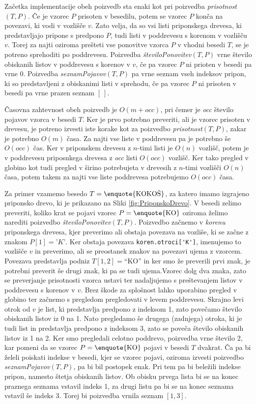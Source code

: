 Začetka implementacije obeh poizvedb sta enaki kot pri poizvedba \textit{prisotnost}$(T,P)$. Če je vzorec $P$ prisoten v besedilu, potem se vzorec $P$ konča na povezavi, ki vodi v vozlišče $v$. Zato velja, da so vsi listi priponskega drevesa, ki predstavljajo pripone s predpono $P$, tudi listi v poddrevesu s korenom v vozlišču $v$. Torej za najti oziroma prešteti vse ponovitve vzorca $P$ v vhodni besedi $T$, se je potreno sprehoditi po poddrevesu. Poizvedba \textit{številoPonovitev}$(T,P)$ vrne število obiskanih listov v poddrevesu s korenov v $v$, če pa vzorec $P$ ni prioten v besedi pa vrne $0$. Poizvedba \textit{seznamPojavov}$(T,P)$ pa vrne seznam vseh indeksov pripon, ki so predstavljeni z obiskanimi listi v sprehodu, če pa vzorec $P$ ni prisoten v besedi pa vrne prazen seznam $[~]$.

Časovna zahtevnost obeh poizvedb je $O(m+\textit{occ})$, pri čemer je \textit{occ} število pojavov vzorca v besedi $T$. Ker je prvo potrebno preveriti, ali je vzorec prisoten v drevesu, je potreno izvesti iste korake kot za poizvedbo \textit{prisotnost}$(T,P)$, zakar je potrebno $O(m)$ časa. Za najti vse liste v poddrevesu pa je potrebno še $O(\textit{occ})$ čas. Ker v priponskem drevesu z $n$-timi listi je $O(n)$ vozlišč, potem je v poddrevesu priposnkega drevesa z \textit{occ} listi $O(\textit{occ})$ vozlišč. Ker tako pregled v globino kot tudi pregled v širino potrebujeta v drevesih z $n$-timi vozlišči $O(n)$ časa, potem takem za najti vse liste poddrevesa potrebujemo $O(\textit{occ})$ časa.

Za primer vzamemo besedo $T=\text{\enquote{KOKOŠ}}$, za katero imamo izgrajeno priponsko drevo, ki je prikazano na Sliki \ref{fig:PriponskoDrevo}. V besedi zelimo preveriti, koliko krat se pojavi vzorec $P=\text{\enquote{KO}}$ oziroma želimo narediti poizvedbo \textit{številoPonovitev}$(T,P)$. Poizvedbo začnemo v \textit{korenu} priponskega drevesa, kjer preverimo ali obstaja povezava na vozliše, ki se začne z znakom $P[1]=\textit{'K'}$. Ker obstaja povezava \verb|koren.otroci['K']|, imenujemo to vozlišče $v$ in preverimo, ali se preostanek znakov na povezavi ujema z vzorcem. Povezava predstavlja podniz $T[1,2]=$\enquote{KO} in ker smo že preverili prvi znak, je potrebni preverit še drugi znak, ki pa se tudi ujema.Vzorec dolg dva znaka, zato se preverjanje prisotnosti vzorca ustavi ter nadaljujemo s preštevanjem listov v poddrevesu s korenov v $v$. Brez škode za splošnost lahko uporabino pregled v globino ter začnemo s pregledom pregledovati v levem poddrevesu. Skrajno levi otrok od $v$ je list, ki predstavlja predpono z indeksom 1, zato povečamo število obiskanih listov iz 0 na 1. Nato pregledamo še drugega (zadnjega) otroka, ki je tudi list in predstavlja predpono z indeksom 3, zato se poveča število obiskanih listov iz 1 na 2. Ker smo pregledali celotno poddrevo, poizvedba vrne število 2, kar pomeni da se vzorec $P=\text{\enquote{KO}}$ pojavi v besedi $T$ dvakrat. Ča pa bi želeli poiskati indekse v besedi, kjer se vzorec pojavi, oziroma izvesti poizvedbo \textit{seznamPojavov}$(T,P)$, pa bi bil postopek enak. Pri tem pa bi beležili indekse pripon, namesto štetja obiskanih listov. Ob obisku prvega lista bi se na konec praznega seznama vstavil indeks 1, za drugi listu pa bi se na konec seznama vstavil še indeks 3. Torej bi poizvedba vrnila seznam $[1,3]$.